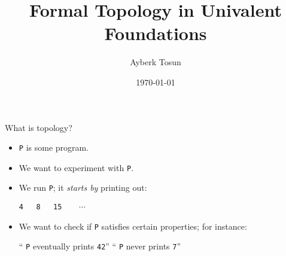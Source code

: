\documentclass[xcolor={dvipsnames}]{beamer}
\title{Formal Topology in Univalent Foundations}
\date{\today}
\author{Ayberk Tosun}
\institute{Chalmers University of Technology}
\newcommand{\fnname}[1]{{\color{AgdaFunction} {\tt #1}}}
\newcommand{\prgoutput}[1]{{\color{AgdaString} {\tt #1}}}
\begin{document}
\maketitle

\begin{frame}{What is topology?}
  \large
  \begin{itemize}
    \item \fnname{P} is some program.
    \item We want to \alert{experiment} with \fnname{P}.
    \item We run \fnname{P}; it \emph{starts by} printing out:
      \begin{center}
        \prgoutput{4~~~8~~~15~~~{\color{black} $\cdots$}}
      \end{center}
    \item We want to check if \fnname{P} satisfies certain \alert{properties};
      for instance:
      \begin{center}
        ``\fnname{P} eventually prints \prgoutput{42}'' \qquad
        ``\fnname{P} never prints \prgoutput{7}''
      \end{center}
  \end{itemize}
\end{frame}
\end{document}
